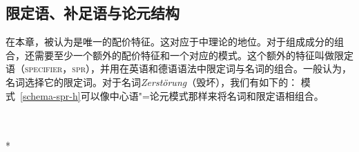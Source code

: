 \subsection{限定语、补足语与论元结构}
\label{Abschnitt-Arg-St}
\label{Abschnitt-Spr}

在本章，\subcat 被认为是唯一的配价特征。这对应于中理论的地位。对于组成成分的组合，还需要至少一个额外的配价特征和一个对应的模式。这个额外的特征叫做限定语（\textsc{specifier}，\textsc{spr}），并用在英语\citep[Chapter~9]{ps2}和德语\citep[Section~9.3]{MuellerLehrbuch1}语法中限定词与名词的组合。一般认为，名词选择它的限定词。对于名词\emph{Zerstörung}（毁坏），我们有如下的\catv ：
\ea
{}
\z
模式~\ref{schema-spr-h}可以像中心语"=论元模式那样来将名词和限定语相组合。
\begin{schema}
\label{schema-spr-h}
~\\
 \impl\\*
\end{schema}
